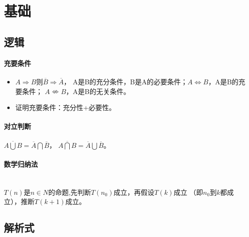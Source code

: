 \documentclass[
12pt, %
a4paper, 
oneside, %
headinclude,footinclude, %
]{scrartcl}
\title{\normalfont\spacedallcaps{数学}}
\date{}
\begin{document}
\maketitle
\newpage
\tableofcontents 
\newpage
\listoftips
\newpage
\section{基础}
\subsection{逻辑}
\paragraph{充要条件}
\begin{itemize}
\item $ A \Rightarrow B $则$ \overline{B} \Rightarrow \overline{A} $，
A是B的充分条件，B是A的必要条件；$ A \Leftrightarrow B $，A是B的充要条件；
$ A \nLeftrightarrow  B $，A是B的无关条件。
\item 证明充要条件：充分性+必要性。
\end{itemize}
\paragraph{对立判断}
$ \overline{A \bigcup B} = \overline{A} \bigcap \overline{B}$，
$ \overline{A \bigcap B} = \overline{A} \bigcup \overline{B}$。
\paragraph{数学归纳法}~\\

$ T(n) $是$ n \in N $的命题,先判断$ T(n_0) $成立，再假设$ T(k) $成立
（即$ n_0 $到$ k $都成立），推断$ T(k+1) $成立。
\subsection{解析式}
\end{document}
